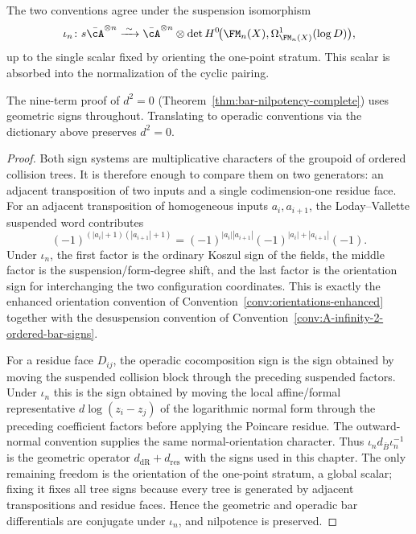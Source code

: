 \begin{lemma}
The two conventions agree under the suspension isomorphism
\[
\iota_n\colon
s\bar\cA^{\otimes n}
\xrightarrow{\;\sim\;}
\bar\cA^{\otimes n}\otimes
\det H^0\!\bigl(\FM_n(X),\Omega^1_{\FM_n(X)}(\log D)\bigr),
\]
up to the single scalar fixed by orienting the one-point stratum. This
scalar is absorbed into the normalization of the cyclic pairing.

The nine-term proof of $d^2 = 0$ (Theorem~\ref{thm:bar-nilpotency-complete}) uses geometric signs throughout. Translating to operadic conventions via the dictionary above preserves $d^2 = 0$.
\end{lemma}

\begin{proof}
Both sign systems are multiplicative characters of the groupoid of
ordered collision trees. It is therefore enough to compare them on two
generators: an adjacent transposition of two inputs and a single
codimension-one residue face. For an adjacent transposition of
homogeneous inputs \(a_i,a_{i+1}\), the Loday--Vallette suspended word
contributes
\[
(-1)^{(|a_i|+1)(|a_{i+1}|+1)}
=
(-1)^{|a_i||a_{i+1}|}
(-1)^{|a_i|+|a_{i+1}|}
(-1).
\]
Under \(\iota_n\), the first factor is the ordinary Koszul sign of the
fields, the middle factor is the suspension/form-degree shift, and the
last factor is the orientation sign for interchanging the two
configuration coordinates. This is exactly the enhanced orientation
convention of Convention~\ref{conv:orientations-enhanced} together with
the desuspension convention of
Convention~\ref{conv:A-infinity-2-ordered-bar-signs}.

For a residue face \(D_{ij}\), the operadic cocomposition sign is the
sign obtained by moving the suspended collision block through the
preceding suspended factors. Under \(\iota_n\) this is the sign obtained
by moving the local affine/formal representative \(d\log(z_i-z_j)\) of
the logarithmic normal form through the preceding coefficient factors
before applying the Poincare residue.
The outward-normal convention supplies the same normal-orientation
character. Thus \(\iota_n d_{\bar B}\iota_n^{-1}\) is the geometric
operator \(d_{\mathrm{dR}}+d_{\mathrm{res}}\) with the signs used in
this chapter. The only remaining freedom is the orientation of the
one-point stratum, a global scalar; fixing it fixes all tree signs
because every tree is generated by adjacent transpositions and residue
faces. Hence the geometric and operadic bar differentials are
conjugate under \(\iota_n\), and nilpotence is preserved.
\end{proof}

